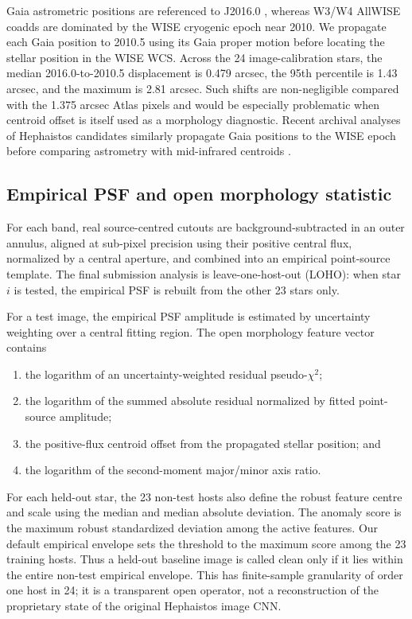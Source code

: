\documentclass[fleqn,usenatbib]{mnras}
\begin{document}
Gaia astrometric positions are referenced to J2016.0 \citep{Lindegren2021}, whereas W3/W4 AllWISE coadds are dominated by the WISE cryogenic epoch near 2010. We propagate each Gaia position to 2010.5 using its Gaia proper motion before locating the stellar position in the WISE WCS. Across the 24 image-calibration stars, the median 2016.0-to-2010.5 displacement is 0.479 arcsec, the 95th percentile is 1.43 arcsec, and the maximum is 2.81 arcsec. Such shifts are non-negligible compared with the 1.375 arcsec Atlas pixels and would be especially problematic when centroid offset is itself used as a morphology diagnostic. Recent archival analyses of Hephaistos candidates similarly propagate Gaia positions to the WISE epoch before comparing astrometry with mid-infrared centroids \citep{Ren2026}.

\subsection{Empirical PSF and open morphology statistic}

For each band, real source-centred cutouts are background-subtracted in an outer annulus, aligned at sub-pixel precision using their positive central flux, normalized by a central aperture, and combined into an empirical point-source template. The final submission analysis is leave-one-host-out (LOHO): when star $i$ is tested, the empirical PSF is rebuilt from the other 23 stars only.

For a test image, the empirical PSF amplitude is estimated by uncertainty weighting over a central fitting region. The open morphology feature vector contains
\begin{enumerate}
\item the logarithm of an uncertainty-weighted residual pseudo-$\chi^2$;
\item the logarithm of the summed absolute residual normalized by fitted point-source amplitude;
\item the positive-flux centroid offset from the propagated stellar position; and
\item the logarithm of the second-moment major/minor axis ratio.
\end{enumerate}
For each held-out star, the 23 non-test hosts also define the robust feature centre and scale using the median and median absolute deviation. The anomaly score is the maximum robust standardized deviation among the active features. Our default empirical envelope sets the threshold to the maximum score among the 23 training hosts. Thus a held-out baseline image is called clean only if it lies within the entire non-test empirical envelope. This has finite-sample granularity of order one host in 24; it is a transparent open operator, not a reconstruction of the proprietary state of the original Hephaistos image CNN.
\end{document}
